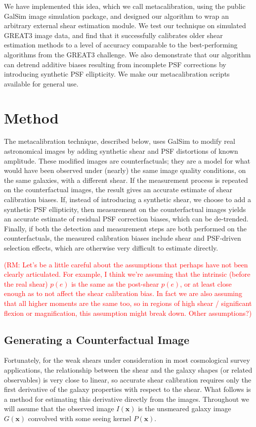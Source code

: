 \documentclass[iop]{emulateapj}
\newcommand\rmcomment[1]{\textcolor{red}{(RM: #1)}}
\begin{document}
We have implemented this idea, which we call metacalibration, using
the public GalSim \citep{2015A&C....10..121R} image simulation
package, and designed our algorithm to wrap an arbitrary external
shear estimation module. We test our technique on simulated GREAT3
image data, and find that it successfully calibrates older shear
estimation methods to a level of accuracy comparable to the
best-performing algorithms from the GREAT3 challenge. We also
demonstrate that our algorithm can detrend additive biases resulting
from incomplete PSF corrections by introducing synthetic PSF
ellipticity.  We make our metacalibration scripts available for
general use.

\section{Method}
The metacalibration technique, described below, uses GalSim
\citep{2015A&C....10..121R} to modify real astronomical images by
adding synthetic shear and PSF distortions of known amplitude. These
modified images are counterfactuals; they are a model for what would
have been observed under (nearly) the same image quality conditions,
on the same galaxies, with a different shear. If the measurement
process is repeated on the counterfactual images, the result gives an
accurate estimate of shear calibration biases. If, instead of
introducing a synthetic shear, we choose to add a synthetic PSF
ellipticity, then measurement on the counterfactual images yields an
accurate estimate of residual PSF correction biases, which can be
de-trended.  Finally, if both the detection and measurement steps are
both performed on the counterfactuals, the measured calibration biases
include shear and PSF-driven selection effects, which are otherwise
very difficult to estimate directly.

\rmcomment{Let's be a little careful about the assumptions that
  perhaps have not been clearly articulated.  For example, I think
  we're assuming that the intrinsic (before the real shear) $p(e)$ is
  the same as the post-shear $p(e)$, or at least close enough as to
  not affect the shear calibration bias.  In fact we are also assuming
  that all higher moments are the same too, so in regions of high
  shear / significant flexion or magnification, this assumption might
  break down.  Other assumptions?}

\subsection{Generating a Counterfactual Image}
Fortunately, for the weak shears under consideration in most
cosmological survey applications, the relationship between the shear
and the galaxy shapes (or related observables) is very close to
linear, so accurate shear calibration requires only the first
derivative of the galaxy properties with respect to the shear. What
follows is a method for estimating this derivative directly from the
images. Throughout we will assume that the observed image
$I({\mathbf{x}})$ is the unsmeared galaxy image $G(\mathbf{x})$
convolved with some seeing kernel $P(\mathbf{x})$.
\end{document}
